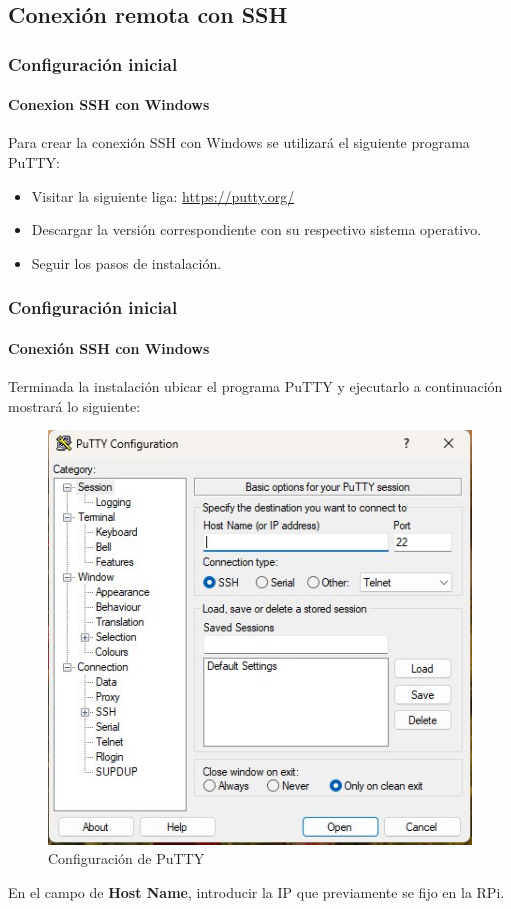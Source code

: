 \documentclass{beamer}
\begin{document}
	\subsection{Conexión remota con SSH}
	\begin{frame}
		\frametitle{Configuración inicial}
		\framesubtitle{Conexion SSH con Windows}
		Para crear la conexión SSH con Windows se utilizará el siguiente programa PuTTY:
		\begin{tcolorbox}[enhanced, title= Instrucciones:]
			\begin{itemize}
				\item Visitar la siguiente liga: \url{https://putty.org/}
				\item Descargar la versión correspondiente con su respectivo sistema operativo.
				\item Seguir los pasos de instalación.
			\end{itemize}
		\end{tcolorbox}
	\end{frame}
	\begin{frame}
		\frametitle{Configuración inicial}
		\framesubtitle{Conexión SSH con Windows}
		Terminada la instalación ubicar el programa PuTTY y ejecutarlo a continuación mostrará lo siguiente:
		\begin{figure}
			\includegraphics[scale=0.4]{putty.jpeg}
			\caption{Configuración de PuTTY}
		\end{figure}
		En el campo de \textbf{Host Name}, introducir la IP que previamente se fijo en la RPi.
	\end{frame}
	
\end{document}
